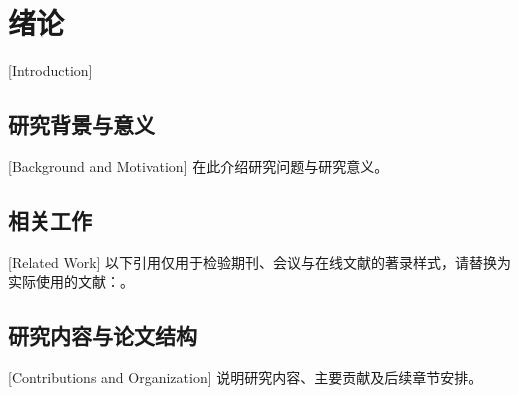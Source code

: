 \chapter{绪论}[Introduction]
\section{研究背景与意义}[Background and Motivation]
在此介绍研究问题与研究意义。
\section{相关工作}[Related Work]
以下引用仅用于检验期刊、会议与在线文献的著录样式，请替换为实际使用的文献：\cite{gordon1993novel,gu2015neural,krishnan2015deep}。
\section{研究内容与论文结构}[Contributions and Organization]
说明研究内容、主要贡献及后续章节安排。
